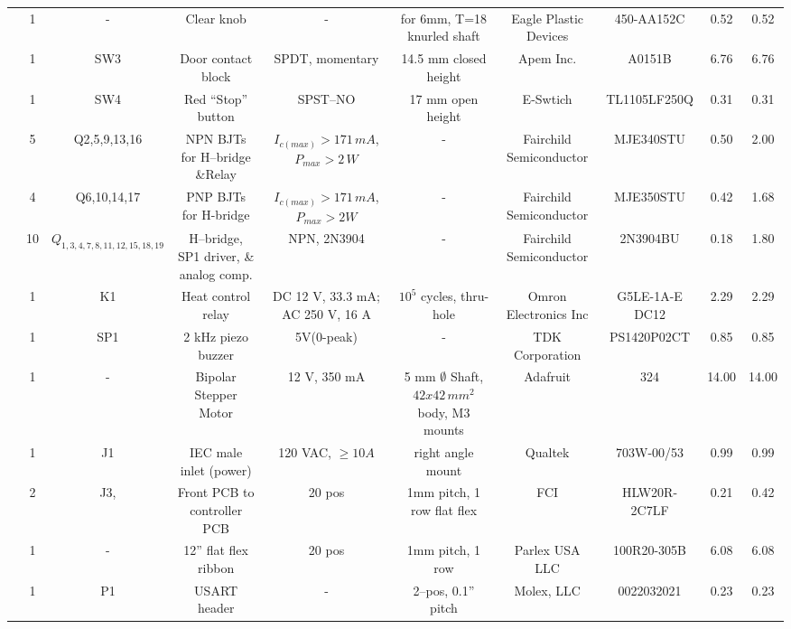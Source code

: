 \documentclass[10pt, twocolumn]{article}
\begin{document}
\begin{center}
\begin{adjustbox}{max width=\textwidth}
\begin{tabular}{c c c c c c c c c c}
	&1	&-	&Clear knob			&-		&for 6mm, T=18 knurled shaft
	&Eagle Plastic Devices	&450-AA152C		&0.52		&0.52	\\
	
	&1	&SW3	&Door contact block	&SPDT, momentary		&14.5 mm closed height
	&Apem Inc.		&A0151B			&6.76		&6.76	\\

	&1	&SW4	&Red ``Stop'' button	&SPST--NO			&17 mm open height
	&E-Swtich		&TL1105LF250Q		&0.31		&0.31	\\

	&5	&Q2,5,9,13,16	&NPN BJTs for H--bridge \&Relay	&$I_{c(max)}>171\,mA$, $P_{max}>2\,W$	&-
	&Fairchild Semiconductor	&MJE340STU	&0.50		&2.00	\\

	&4	&Q6,10,14,17	&PNP BJTs for H-bridge	&$I_{c(max)}>171\,mA$, $P_{max}>2W$	&-
	&Fairchild Semiconductor	&MJE350STU	&0.42		&1.68	\\

	&10	&$Q_{1,3,4,7,8,11,12,15,18,19}$	&H--bridge, SP1 driver, \& analog comp.	&NPN, 2N3904	&-
	&Fairchild Semiconductor	&2N3904BU	&0.18		&1.80	\\

	&1	&K1	&Heat control relay		&DC 12 V, 33.3 mA; AC 250 V, 16 A	&$10^5$ cycles, thru-hole
	&Omron Electronics Inc	&G5LE-1A-E DC12		&2.29		&2.29	\\

	&1	&SP1	&2 kHz piezo buzzer	&5V(0-peak)			&-
	&TDK Corporation	&PS1420P02CT		&0.85		&0.85	\\

	&1	&-	&Bipolar Stepper Motor	&12 V, 350 mA		&5 mm $\emptyset$ Shaft, $42x42\,mm^{2}$ body, M3 mounts
	&Adafruit		&324			&14.00		&14.00	\\

	&1	&J1	&IEC male inlet (power)	&120 VAC, $\geq 10A$		&right angle mount
	&Qualtek		&703W-00/53		&0.99		&0.99	\\

	&2	&J3,	&Front PCB to controller PCB	&20 pos			&1mm pitch, 1 row flat flex
	&FCI			&HLW20R-2C7LF		&0.21		&0.42	\\

	&1	&-	&12” flat flex ribbon		&20 pos		&1mm pitch, 1 row
	&Parlex USA LLC		&100R20-305B		&6.08		&6.08	\\

	&1	&P1	&USART header			&-				&2--pos, 0.1” pitch
	&Molex, LLC	&0022032021			&0.23		&0.23	\\


\end{tabular}
\end{adjustbox}
\end{center}
\end{document}
